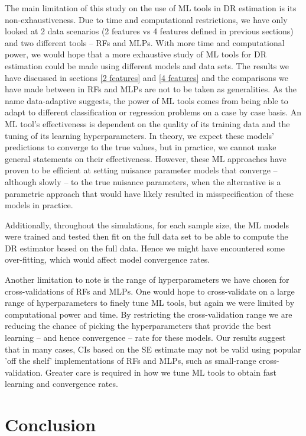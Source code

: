 \documentclass[12pt,twoside]{article}
\begin{document}
The main limitation of this study on the use of ML tools in DR estimation is its non-exhaustiveness. Due to time and computational restrictions, we have only looked at 2 data scenarios (2 features vs 4 features defined in previous sections) and two different tools -- RFs and MLPs. With more time and computational power, we would hope that a more exhaustive study of ML tools for DR estimation could be made using different models and data sets. The results we have discussed in sections \ref{2 features} and \ref{4 features} and the comparisons we have made between in RFs and MLPs are not to be taken as generalities. As the name data-adaptive suggests, the power of ML tools comes from being able to adapt to different classification or regression problems on a case by case basis. An ML tool's effectiveness is dependent on the quality of its training data and the tuning of its learning hyperparameters. In theory, we expect these models' predictions to converge to the true values, but in practice, we cannot make general statements on their effectiveness. However, these ML approaches have proven to be efficient at setting nuisance parameter models that converge -- although slowly -- to the true nuisance parameters, when the alternative is a parametric approach that would have likely resulted in misspecification of these models in practice. 

Additionally, throughout the simulations, for each sample size, the ML models were trained and tested then fit on the full data set to be able to compute the DR estimator based on the full data. Hence we might have encountered some over-fitting, which would affect model convergence rates.

Another limitation to note is the range of hyperparameters we have chosen for cross-validations of RFs and MLPs. One would hope to cross-validate on a large range of hyperparameters to finely tune ML tools, but again we were limited by computational power and time. By restricting the cross-validation range we are reducing the chance of picking the hyperparameters that provide the best learning -- and hence convergence -- rate for these models. Our results suggest that in many cases, CIs based on the \cite{lunceford_davidian} SE estimate may not be valid using popular 'off the shelf' implementations of RFs and MLPs, such as small-range cross-validation. Greater care is required in how we tune ML tools to obtain fast learning and convergence rates.

\section{Conclusion}
\end{document}
